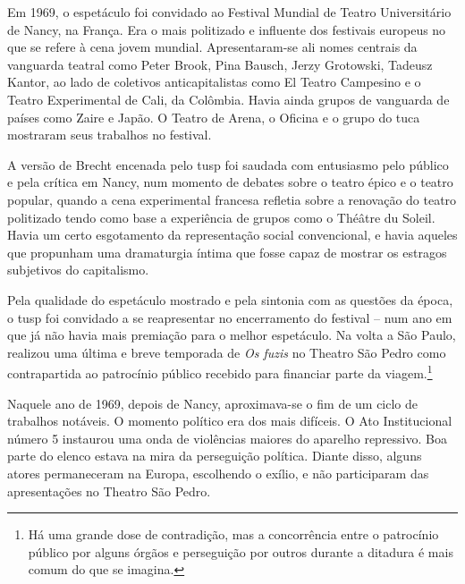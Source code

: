 Em 1969, o espetáculo foi convidado ao Festival Mundial de Teatro
Universitário de Nancy, na França. Era o mais politizado e influente dos
festivais europeus no que se refere à cena jovem mundial.
Apresentaram-se ali nomes centrais da vanguarda teatral como Peter
Brook, Pina Bausch, Jerzy Grotowski, Tadeusz Kantor, ao lado de
coletivos anticapitalistas como El Teatro Campesino e o Teatro
Experimental de Cali, da Colômbia. Havia ainda grupos de vanguarda de
países como Zaire e Japão. O Teatro de Arena, o Oficina e o grupo do
{\sc tuca} mostraram seus trabalhos no festival.

A versão de Brecht encenada pelo {\sc tusp} foi saudada com entusiasmo pelo
público e pela crítica em Nancy, num momento de debates sobre o teatro
épico e o teatro popular, quando a cena experimental francesa refletia
sobre a renovação do teatro politizado tendo como base a experiência de
grupos como o Théâtre du Soleil. Havia um certo esgotamento da
representação social convencional, e havia aqueles que propunham uma
dramaturgia íntima que fosse capaz de mostrar os estragos subjetivos do
capitalismo.

Pela qualidade do espetáculo mostrado e pela sintonia com as questões da
época, o {\sc tusp} foi convidado a se reapresentar no encerramento do
festival -- num ano em que já não havia mais premiação para o melhor
espetáculo. Na volta a São Paulo, realizou uma última e breve temporada
de {\it Os fuzis} no Theatro São Pedro como contrapartida ao patrocínio
público recebido para financiar parte da viagem.\footnote{Há uma grande
  dose de contradição, mas a concorrência entre o patrocínio público por
  alguns órgãos e perseguição por outros durante a ditadura é mais comum
  do que se imagina.}

Naquele ano de 1969, depois de Nancy, aproximava-se o fim de um ciclo de
trabalhos notáveis. O momento político era dos mais difíceis. O Ato
Institucional número 5 instaurou uma onda de violências maiores do
aparelho repressivo. Boa parte do elenco estava na mira da perseguição
política. Diante disso, alguns atores permaneceram na Europa, escolhendo
o exílio, e não participaram das apresentações no Theatro São Pedro.


